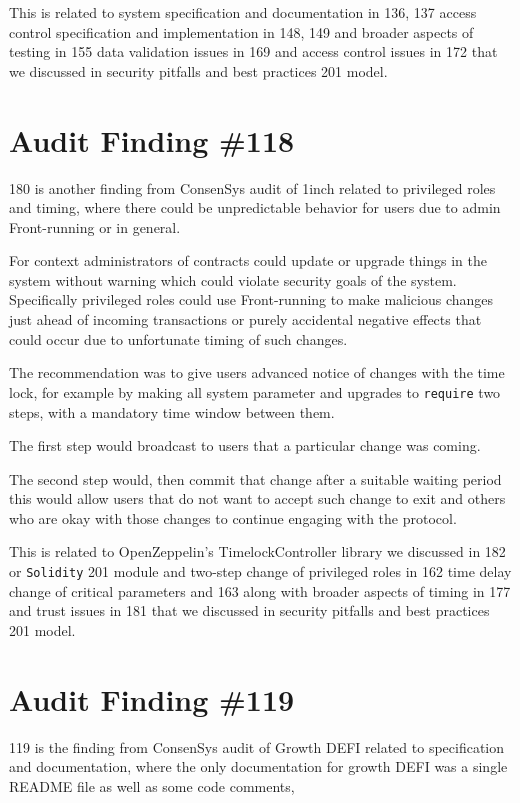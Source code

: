 This is related to system specification and documentation in 136, 137 access control specification and implementation in 148, 149 and broader aspects of testing in 155 data validation issues in 169 and access control issues in 172 that we discussed in security pitfalls and best practices 201 model.

\section{Audit Finding \#118}

180 is another finding from ConsenSys audit of 1inch related to privileged roles and timing, where there could be unpredictable behavior for users due to admin Front-running or in general. 

For context administrators of contracts could update or upgrade things in the system without warning which could violate security goals of the system. Specifically privileged roles could use Front-running to make malicious changes just ahead of incoming transactions or purely accidental negative effects that could occur due to unfortunate timing of such changes.

The recommendation was to give users advanced notice of changes with the time lock, for example by making all system parameter and upgrades to \verb|require| two steps, with a mandatory time window between them.

The first step would broadcast to users that a particular change was coming. 

The second step would, then commit that change after a suitable waiting period this would allow users that do not want to accept such change to exit and others who are okay with those changes to continue engaging with the protocol.

This is related to OpenZeppelin's TimelockController library we discussed in 182 or \verb|Solidity| 201 module and two-step change of privileged roles in 162 time delay change of critical parameters and 163 along with broader aspects of timing in 177 and trust issues in 181 that we discussed in security pitfalls and best practices 201 model.

\section{Audit Finding \#119}

119 is the finding from ConsenSys audit of Growth DEFI related to specification and documentation, where the only documentation for growth DEFI was a single README file as well as some code comments, 

